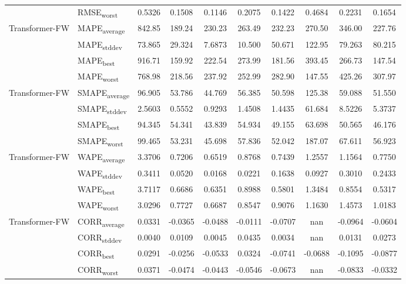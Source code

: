 {\begin{longtable}{l l c c c c c c c c}
 & RMSE\textsubscript{worst} & 0.5326 & 0.1508 & 0.1146 & 0.2075 & 0.1422 & 0.4684 & 0.2231 & 0.1654 \\
\cmidrule(lr){2-10}
\multirow{4}{*}{Transformer-FW} & MAPE\textsubscript{average} & 842.85 & 189.24 & 230.23 & 263.49 & 232.23 & 270.50 & 346.00 & 227.76 \\
 & MAPE\textsubscript{stddev} & 73.865 & 29.324 & 7.6873 & 10.500 & 50.671 & 122.95 & 79.263 & 80.215 \\
 & MAPE\textsubscript{best} & 916.71 & 159.92 & 222.54 & 273.99 & 181.56 & 393.45 & 266.73 & 147.54 \\
 & MAPE\textsubscript{worst} & 768.98 & 218.56 & 237.92 & 252.99 & 282.90 & 147.55 & 425.26 & 307.97 \\
\cmidrule(lr){2-10}
\multirow{4}{*}{Transformer-FW} & SMAPE\textsubscript{average} & 96.905 & 53.786 & 44.769 & 56.385 & 50.598 & 125.38 & 59.088 & 51.550 \\
 & SMAPE\textsubscript{stddev} & 2.5603 & 0.5552 & 0.9293 & 1.4508 & 1.4435 & 61.684 & 8.5226 & 5.3737 \\
 & SMAPE\textsubscript{best} & 94.345 & 54.341 & 43.839 & 54.934 & 49.155 & 63.698 & 50.565 & 46.176 \\
 & SMAPE\textsubscript{worst} & 99.465 & 53.231 & 45.698 & 57.836 & 52.042 & 187.07 & 67.611 & 56.923 \\
\cmidrule(lr){2-10}
\multirow{4}{*}{Transformer-FW} & WAPE\textsubscript{average} & 3.3706 & 0.7206 & 0.6519 & 0.8768 & 0.7439 & 1.2557 & 1.1564 & 0.7750 \\
 & WAPE\textsubscript{stddev} & 0.3411 & 0.0520 & 0.0168 & 0.0221 & 0.1638 & 0.0927 & 0.3010 & 0.2433 \\
 & WAPE\textsubscript{best} & 3.7117 & 0.6686 & 0.6351 & 0.8988 & 0.5801 & 1.3484 & 0.8554 & 0.5317 \\
 & WAPE\textsubscript{worst} & 3.0296 & 0.7727 & 0.6687 & 0.8547 & 0.9076 & 1.1630 & 1.4573 & 1.0183 \\
\cmidrule(lr){2-10}
\multirow{4}{*}{Transformer-FW} & CORR\textsubscript{average} & 0.0331 & -0.0365 & -0.0488 & -0.0111 & -0.0707 & nan & -0.0964 & -0.0604 \\
 & CORR\textsubscript{stddev} & 0.0040 & 0.0109 & 0.0045 & 0.0435 & 0.0034 & nan & 0.0131 & 0.0273 \\
 & CORR\textsubscript{best} & 0.0291 & -0.0256 & -0.0533 & 0.0324 & -0.0741 & -0.0688 & -0.1095 & -0.0877 \\
 & CORR\textsubscript{worst} & 0.0371 & -0.0474 & -0.0443 & -0.0546 & -0.0673 & nan & -0.0833 & -0.0332 \\

\end{longtable}}
